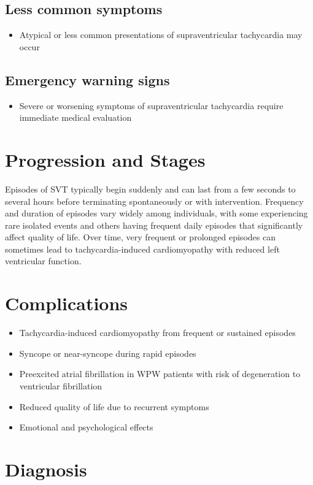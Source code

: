 \subsection{Less common symptoms}
\begin{itemize}[noitemsep]
  \item Atypical or less common presentations of supraventricular tachycardia may occur
\end{itemize}

\subsection{Emergency warning signs}
\begin{itemize}[noitemsep]
  \item Severe or worsening symptoms of supraventricular tachycardia require immediate medical evaluation
\end{itemize}
\section{Progression and Stages}
Episodes of SVT typically begin suddenly and can last from a few seconds to several hours before terminating spontaneously or with intervention. Frequency and duration of episodes vary widely among individuals, with some experiencing rare isolated events and others having frequent daily episodes that significantly affect quality of life. Over time, very frequent or prolonged episodes can sometimes lead to tachycardia-induced cardiomyopathy with reduced left ventricular function.

\section{Complications}

\begin{itemize}[noitemsep]
  \item Tachycardia-induced cardiomyopathy from frequent or sustained episodes
  \item Syncope or near-syncope during rapid episodes
  \item Preexcited atrial fibrillation in WPW patients with risk of degeneration to ventricular fibrillation
  \item Reduced quality of life due to recurrent symptoms
  \item Emotional and psychological effects
\end{itemize}

\section{Diagnosis}

